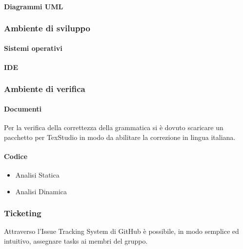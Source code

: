                         \paragraph{Diagrammi UML}
                        \subsubsection{Ambiente di sviluppo}
                            \paragraph{Sistemi operativi}
                            \paragraph{IDE}
                        \subsubsection{Ambiente di verifica}
                            \paragraph{Documenti} 
                                Per la verifica della correttezza della grammatica si è dovuto scaricare un pacchetto per TexStudio in modo da abilitare la correzione in lingua italiana.
                            \paragraph{Codice}
                                \begin{itemize}
                                    \item Analisi Statica
                                    \item Analisi Dinamica
                                \end{itemize}            
                         \subsubsection{Ticketing}
                             Attraverso l'Issue Tracking System di GitHub è possibile, in modo semplice ed intuitivo, assegnare tasks ai membri del gruppo.
